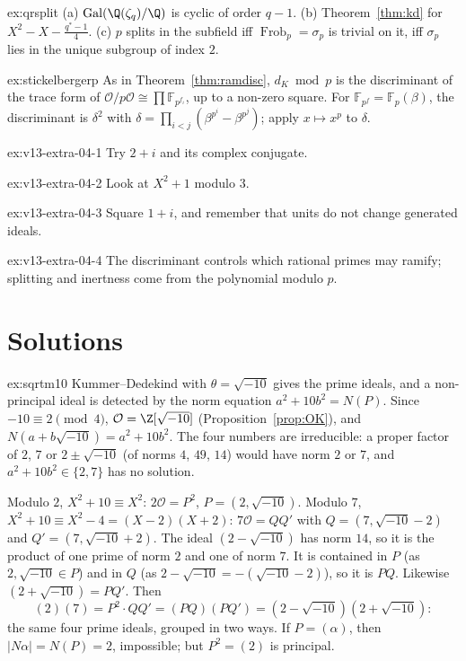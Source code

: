 \begin{hint}{ex:qrsplit}
(a) $\operatorname{Gal}(\Q(\zeta_q)/\Q)$ is cyclic of order $q-1$. (b) Theorem~\ref{thm:kd} for $X^2-X-\frac{q^*-1}4$.
(c) $p$ splits in the subfield iff $\operatorname{Frob}_p=\sigma_p$ is trivial on it, iff $\sigma_p$ lies in the unique
subgroup of index $2$.
\end{hint}
\begin{hint}{ex:stickelbergerp}
As in Theorem~\ref{thm:ramdisc}, $d_K\bmod p$ is the discriminant of the trace form of $\mathcal O/p\mathcal O\cong\prod
\mathbb F_{p^{f_i}}$, up to a non-zero square. For $\mathbb F_{p^f}=\mathbb F_p(\beta)$, the discriminant is $\delta^2$
with $\delta=\prod_{i<j}(\beta^{p^i}-\beta^{p^j})$; apply $x\mapsto x^p$ to $\delta$.
\end{hint}

\begin{hint}{ex:v13-extra-04-1}
Try $2+i$ and its complex conjugate.
\end{hint}

\begin{hint}{ex:v13-extra-04-2}
Look at $X^2+1$ modulo $3$.
\end{hint}

\begin{hint}{ex:v13-extra-04-3}
Square $1+i$, and remember that units do not change generated ideals.
\end{hint}

\begin{hint}{ex:v13-extra-04-4}
The discriminant controls which rational primes may ramify; splitting and inertness come from the polynomial modulo $p$.
\end{hint}

\section{Solutions}

\begin{solution}{ex:sqrtm10}
\idea Kummer--Dedekind with $\theta=\sqrt{-10}$ gives the prime ideals, and a non-principal ideal is detected by the norm
equation $a^2+10b^2=N(P)$.
\writeup Since $-10\equiv2\pmod 4$, $\mathcal O=\Z[\sqrt{-10}]$ (Proposition~\ref{prop:OK}), and $N(a+b\sqrt{-10})=a^2+10b^2$.
The four numbers are irreducible: a proper factor of $2$, $7$ or $2\pm\sqrt{-10}$ (of norms $4$, $49$, $14$) would have
norm $2$ or $7$, and $a^2+10b^2\in\{2,7\}$ has no solution.

Modulo $2$, $X^2+10\equiv X^2$: $2\mathcal O=P^2$, $P=(2,\sqrt{-10})$. Modulo $7$, $X^2+10\equiv X^2-4=(X-2)(X+2)$:
$7\mathcal O=QQ'$ with $Q=(7,\sqrt{-10}-2)$ and $Q'=(7,\sqrt{-10}+2)$. The ideal $(2-\sqrt{-10})$ has norm $14$, so it is
the product of one prime of norm $2$ and one of norm $7$. It is contained in $P$ (as $2,\sqrt{-10}\in P$) and in $Q$ (as
$2-\sqrt{-10}=-(\sqrt{-10}-2)$), so it is $PQ$. Likewise $(2+\sqrt{-10})=PQ'$. Then
\[
(2)(7)=P^2\cdot QQ'=(PQ)(PQ')=(2-\sqrt{-10})(2+\sqrt{-10}):
\]
the same four prime ideals, grouped in two ways. If $P=(\alpha)$, then $|N\alpha|=N(P)=2$, impossible; but $P^2=(2)$ is
principal.
\end{solution}

